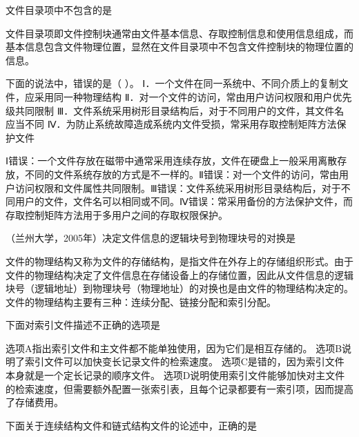 \question 文件目录项中不包含的是
\par{}
\begin{solution}文件目录项即文件控制块通常由文件基本信息、存取控制信息和使用信息组成，而基本信息包含文件物理位置，显然在文件目录项中不包含文件控制块的物理位置的信息。
\end{solution}
\question 下面的说法中，错误的是（ ）。
Ⅰ．一个文件在同一系统中、不同介质上的复制文件，应采用同一种物理结构
Ⅱ．对一个文件的访问，常由用户访问权限和用户优先级共同限制
Ⅲ．文件系统采用树形目录结构后，对于不同用户的文件，其文件名应当不同
Ⅳ．为防止系统故障造成系统内文件受损，常采用存取控制矩阵方法保护文件
\par{}
\begin{solution}Ⅰ错误：一个文件存放在磁带中通常采用连续存放，文件在硬盘上一般采用离散存放，不同的文件系统存放的方式是不一样的。Ⅱ错误：对一个文件的访问，常由用户访问权限和文件属性共同限制。Ⅲ错误：文件系统采用树形目录结构后，对于不同用户的文件，文件名可以相同或不同。Ⅳ错误：常采用备份的方法保护文件，而存取控制矩阵方法用于多用户之间的存取权限保护。
\end{solution}
\question （兰州大学，2005年）决定文件信息的逻辑块号到物理块号的对换是
\par{}
\begin{solution}文件的物理结构又称为文件的存储结构，是指文件在外存上的存储组织形式。由于文件的物理结构决定了文件信息在存储设备上的存储位置，因此从文件信息的逻辑块号（逻辑地址）到物理块号（物理地址）的对换也是由文件的物理结构决定的。
文件的物理结构主要有三种：连续分配、链接分配和索引分配。
\end{solution}
\question 下面对索引文件描述不正确的选项是
\par{}
\begin{solution}选项A指出索引文件和主文件都不能单独使用，因为它们是相互存储的。
选项B说明了索引文件可以加快变长记录文件的检索速度。
选项C是错的，因为索引文件本身就是一个定长记录的顺序文件。
选项D说明使用索引文件能够加快对主文件的检索速度，但需要额外配置一张索引表，且每个记录都要有一索引项，因而提高了存储费用。
\end{solution}
\question 下面关于连续结构文件和链式结构文件的论述中，正确的是
\par{}
